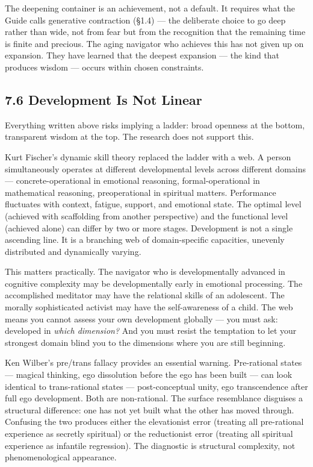 The deepening container is an achievement, not a default. It requires what the Guide calls generative contraction (§1.4) — the deliberate choice to go deep rather than wide, not from fear but from the recognition that the remaining time is finite and precious. The aging navigator who achieves this has not given up on expansion. They have learned that the deepest expansion — the kind that produces wisdom — occurs within chosen constraints.


\subsection*{7.6 Development Is Not Linear}


Everything written above risks implying a ladder: broad openness at the bottom, transparent wisdom at the top. The research does not support this.


Kurt Fischer's dynamic skill theory replaced the ladder with a web. A person simultaneously operates at different developmental levels across different domains — concrete-operational in emotional reasoning, formal-operational in mathematical reasoning, preoperational in spiritual matters. Performance fluctuates with context, fatigue, support, and emotional state. The optimal level (achieved with scaffolding from another perspective) and the functional level (achieved alone) can differ by two or more stages. Development is not a single ascending line. It is a branching web of domain-specific capacities, unevenly distributed and dynamically varying.


This matters practically. The navigator who is developmentally advanced in cognitive complexity may be developmentally early in emotional processing. The accomplished meditator may have the relational skills of an adolescent. The morally sophisticated activist may have the self-awareness of a child. The web means you cannot assess your own development globally — you must ask: developed in \textit{which dimension?} And you must resist the temptation to let your strongest domain blind you to the dimensions where you are still beginning.


Ken Wilber's pre/\allowbreak trans fallacy provides an essential warning. Pre-rational states — magical thinking, ego dissolution before the ego has been built — can look identical to trans-rational states — post-conceptual unity, ego transcendence after full ego development. Both are non-rational. The surface resemblance disguises a structural difference: one has not yet built what the other has moved through. Confusing the two produces either the elevationist error (treating all pre-rational experience as secretly spiritual) or the reductionist error (treating all spiritual experience as infantile regression). The diagnostic is structural complexity, not phenomenological appearance.



